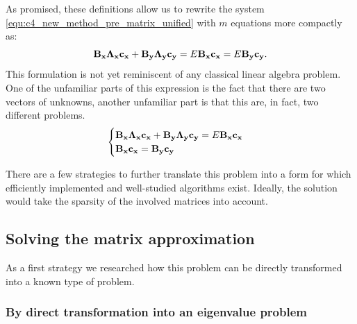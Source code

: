 As promised, these definitions allow us to rewrite the system \eqref{equ:c4_new_method_pre_matrix_unified} with $m$ equations more compactly as:
$$
    \vb{B_x} \vb{\Lambda_x}\vb{c_x} + \vb{B_y} \vb{\Lambda_y}\vb{c_y} = E \vb{B_x} \vb{c_x} = E \vb{B_y} \vb{c_y}\text{.}
$$
This formulation is not yet reminiscent of any classical linear algebra problem. One of the unfamiliar parts of this expression is the fact that there are two vectors of unknowns, another unfamiliar part is that this are, in fact, two different problems.
\begin{equation}
    \begin{cases}
        \vb{B_x} \vb{\Lambda_x}\vb{c_x} + \vb{B_y} \vb{\Lambda_y}\vb{c_y} = E \vb{B_x} \vb{c_x} \\
        \vb{B_x} \vb{c_x} = \vb{B_y} \vb{c_y}
    \end{cases} \label{equ:c4_new_method_first_matrix_problem}
\end{equation}

There are a few strategies to further translate this problem into a form for which efficiently implemented and well-studied algorithms exist. Ideally, the solution would take the sparsity of the involved matrices into account.

\subsection{Solving the matrix approximation}

As a first strategy we researched how this problem can be directly transformed into a known type of problem.

\subsubsection{By direct transformation into an eigenvalue problem}

